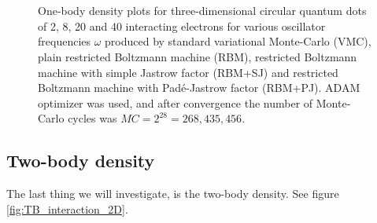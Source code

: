 \begin{figure} [H]%
	\centering
	\\
	
	\\
	
	
	\caption{One-body density plots for three-dimensional circular quantum dots of 2, 8, 20 and 40 interacting electrons for various oscillator frequencies $\omega$ produced by standard variational Monte-Carlo (VMC), plain restricted Boltzmann machine (RBM), restricted Boltzmann machine with simple Jastrow factor (RBM+SJ) and restricted Boltzmann machine with Padé-Jastrow factor (RBM+PJ). ADAM optimizer was used, and after convergence the number of Monte-Carlo cycles was $MC=2^{28}=268,435,456$.}%
	\label{fig:OB_interaction_3D}
\end{figure}

\subsection{Two-body density}
The last thing we will investigate, is the two-body density. See figure \eqref{fig:TB_interaction_2D}.

